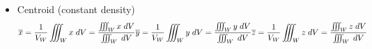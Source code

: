 \begin{itemize}
\begin{itemize}
\begin{equation}
					\end{equation}
					\begin{itemize}
						\item Centroid (constant density)
						\begin{equation}
								\overline{x} = \frac{1}{V_W} \iiint_W x \; dV = \frac{\iiint_W x \; dV}{\iiint_W \; dV} \\
								\overline{y} = \frac{1}{V_W} \iiint_W y \; dV = \frac{\iiint_W y \; dV}{\iiint_W \; dV} \\
								\overline{z} = \frac{1}{V_W} \iiint_W z \; dV = \frac{\iiint_W z \; dV}{\iiint_W \; dV}
							\end{equation}
					\end{itemize}
			\end{itemize}
	\end{itemize}
